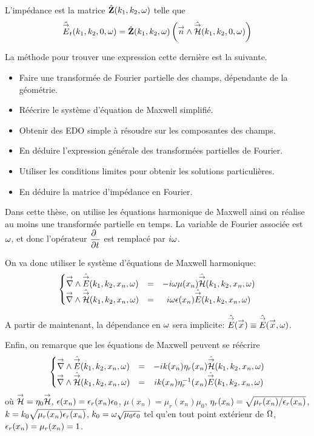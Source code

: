 \begin{defn}
    L'impédance est la matrice \(\hat\mZ(k_1,k_2,\w)\) telle que
    \begin{equation*}
        \hat{\vE}_t(k_1,k_2,0,\w) =  \hat{\mZ}(k_1,k_2,\w) \left(\vn \pvect \hat{\vH}(k_1,k_2,0,\w) \right)
    \end{equation*}
\end{defn}

La méthode pour trouver une expression cette dernière est la suivante.
\begin{itemize}
    \item Faire une transformée de Fourier partielle des champs, dépendante de la géométrie.
    \item Réécrire le système d'équation de Maxwell simplifié.
    \item Obtenir des EDO simple à résoudre sur les composantes des champs.
    \item En déduire l'expression générale des transformées partielles de Fourier.
    \item Utiliser les conditions limites pour obtenir les solutions particulières.
    \item En déduire la matrice d'impédance en Fourier.
\end{itemize}

Dans cette thèse, on utilise les équations harmonique de Maxwell ainsi on réalise au moins une transformée partielle en temps. La variable de Fourier associée est \(\w\), et donc l'opérateur \(\ddr{t}{~}\) est remplacé par \(i\w\).

On va donc utiliser le système d'équations de Maxwell harmonique:
\begin{equation}
    \left\lbrace
    \begin{matrix}
    \vrot \hat \vE(k_1,k_2,x_n,\w)  &=& -i \omega \mu(x_n) \hat \vH(k_1,k_2,x_n,\w)  \\
    \vrot \hat \vH(k_1,k_2,x_n,\w)  &=& i \omega \eps(x_n) \hat \vE(k_1,k_2,x_n,\w)
    \end{matrix}
    \right.
    \label{eq:imp_fourier:intro:maxwell_harmonique}
\end{equation}

A partir de maintenant, la dépendance en \(\w\) sera implicite: \(\hat \vE(\vx) \equiv \hat \vE (\vx, \w)\).

Enfin, on remarque que les équations de Maxwell peuvent se réécrire
\begin{equation}
    \left\lbrace
    \begin{matrix}
    \vrot \hat \vE(k_1,k_2,x_n,\w)  &=& -i k(x_n) \eta_r(x_n) \hat{\mathcal{\vH}}(k_1,k_2,x_n,\w)  \\
    \vrot \hat{\mathcal{\vH}}(k_1,k_2,x_n,\w)  &=& i k(x_n) \eta_r^{-1}(x_n) \hat \vE(k_1,k_2,x_n,\w)
    \end{matrix}
    \right.
    \label{eq:imp_fourier:intro:maxwell_harmonique:form_cea}
\end{equation}
où \(\mathcal{\vH} = \eta_0\vH\), \(\epsilon(x_n)=\eps_r(x_n)\eps_0\), \(\mu(x_n)=\mu_r(x_n)\mu_0\), \(\eta_r(x_n)=\sqrt{\mu_r(x_n)/\eps_r(x_n)}\), \(k=k_0\sqrt{\mu_r(x_n)\eps_r(x_n)}\), \(k_0 = \w\sqrt{\mu_0\eps_0}\) tel qu'en tout point extérieur de \(\OO\), \(\eps_r(x_n) = \mu_r(x_n)= 1\).

